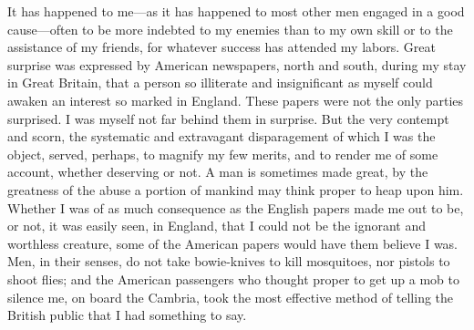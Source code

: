It has happened to me---as it has happened to most other men engaged in
a good cause---often to be more indebted to my enemies than to my own
skill or to the assistance of my friends, for whatever success has
attended my labors. Great surprise was expressed by American newspapers,
north and south, during my stay in Great Britain, that a person so
illiterate and insignificant as myself could awaken an interest so
marked in England. These papers were not the only parties surprised. I
was myself not far behind them in surprise. But the very contempt and
scorn, the systematic and extravagant disparagement of which I was the
object, served, perhaps, to magnify {\protect\hypertarget{381}{}{}}my
few merits, and to render me of some account, whether deserving or not.
A man is sometimes made great, by the greatness of the abuse a portion
of mankind may think proper to heap upon him. Whether I was of as much
consequence as the English papers made me out to be, or not, it was
easily seen, in England, that I could not be the ignorant and worthless
creature, some of the American papers would have them believe I was.
Men, in their senses, do not take bowie-knives to kill mosquitoes, nor
pistols to shoot flies; and the American passengers who thought proper
to get up a mob to silence me, on board the Cambria, took the most
effective method of telling the British public that I had something to
say.

